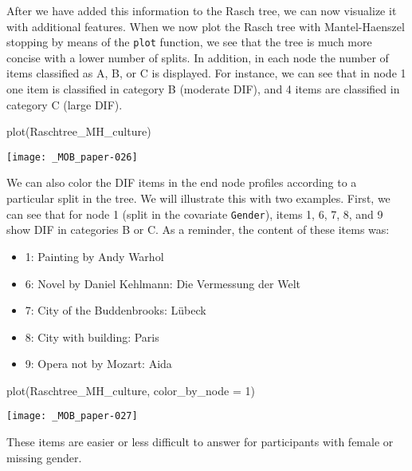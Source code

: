 \documentclass[doc,floatsintext,natbib]{apa7}
\begin{document}
After we have added this information to the Rasch tree, we can now visualize it with additional features. When we now plot the Rasch tree with Mantel-Haenszel stopping by means of the \texttt{plot} function, we see that the tree is much more concise with a lower number of splits. In addition, in each node the number of items classified as A, B, or C is displayed. For instance, we can see that in node 1 one item is classified in category B (moderate DIF), and 4 items are classified in category C (large DIF).

\begin{Schunk}
\begin{Sinput}
 plot(Raschtree_MH_culture)
\end{Sinput}
\end{Schunk}
\texttt{[image: \_MOB\_paper-026]}

We can also color the DIF items in the end node profiles according to a particular split in the tree. We will illustrate this with two examples. 
First, we can see that for node 1 (split in the covariate \texttt{Gender}), items 1, 6, 7, 8, and 9 show DIF in categories B or C. As a reminder, the content of these items was:

\begin{itemize}
\item 1: Painting by Andy Warhol
\item 6: Novel by Daniel Kehlmann: Die Vermessung der Welt
\item 7: City of the Buddenbrooks: Lübeck
\item 8: City with building: Paris
\item 9: Opera not by Mozart: Aida
\end{itemize}

\begin{Schunk}
\begin{Sinput}
 plot(Raschtree_MH_culture, color_by_node = 1)
\end{Sinput}
\end{Schunk}
\texttt{[image: \_MOB\_paper-027]}

These items are %
easier or less difficult to answer for participants with female or missing gender.

\end{document}
